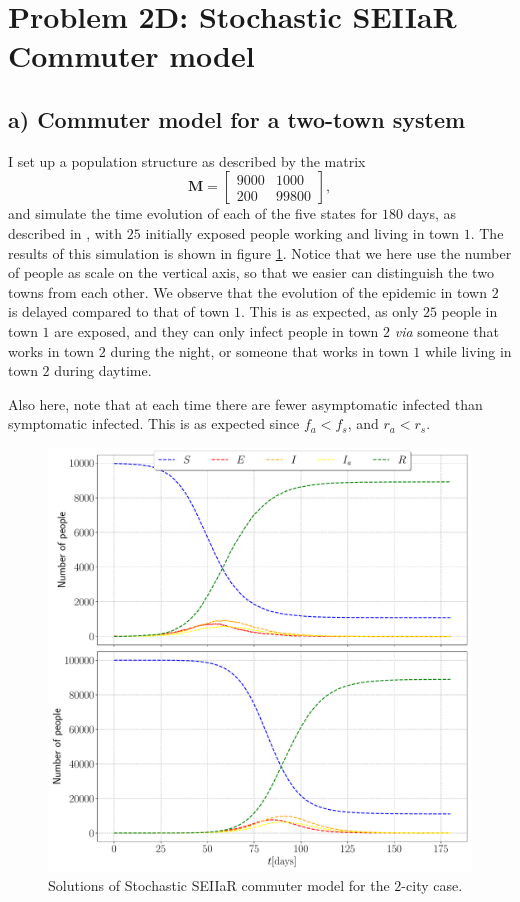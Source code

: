\section{Problem 2D: Stochastic SEIIaR Commuter model}

\subsection{a) Commuter model for a two-town system}

I set up a population structure as described by the matrix 
$$
	\mathbf{M} = \begin{bmatrix}
	9000 & 1000 \\
	200 & 99800
	\end{bmatrix},
$$
and simulate the time evolution of each of the five states for $180$ days, as described in \cite{sheet}, with $25$ initially exposed people working and living in town $1$. The results of this simulation is shown in figure \ref{fig:commuter_2city}. Notice that we here use the number of people as scale on the vertical axis, so that we easier can distinguish the two towns from each other. We observe that the evolution of the epidemic in town $2$ is delayed compared to that of town $1$. This is as expected, as only $25$ people in town $1$ are exposed, and they can only infect people in town $2$ \textit{via} someone that works in town $2$ during the night, or someone that works in town $1$ while living in town $2$ during daytime. 

Also here, note that at each time there are fewer asymptomatic infected than symptomatic infected. This is as expected since $f_a < f_s$, and $r_a < r_s$.

\begin{figure}[htb]
	\centering
	\includegraphics[width=0.8\columnwidth]{../fig/2Da_commuter.pdf}
	\caption{Solutions of Stochastic SEIIaR commuter model for the $2$-city case.}
	\label{fig:commuter_2city}
\end{figure}

